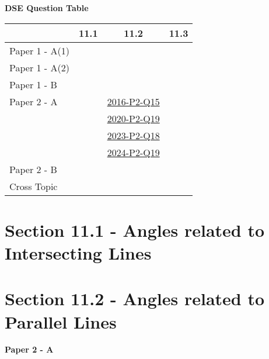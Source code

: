 \documentclass[12pt, a4paper]{article}
\begin{document}
\begin{absolutelynopagebreak}
\begin{center}
\textbf{DSE Question Table}
\end{center}
\begin{center}
\begin{tabular}{|l|c|c|c|}
\hline
        & 11.1 & 11.2 & 11.3 \\\hline
\hline
Paper 1 - A(1)&  &  &  \\
\hline
Paper 1 - A(2)&  &  &  \\
\hline
Paper 1 - B&  &  &  \\
\hline
\hline
Paper 2 - A&  & \hyperref[DSE2016-CoreP2-Q15]{2016-P2-Q15} &  \\
&  & \hyperref[DSE2020-CoreP2-Q19]{2020-P2-Q19} &  \\
&  & \hyperref[DSE2023-CoreP2-Q18]{2023-P2-Q18} &  \\
&  & \hyperref[DSE2024-CoreP2-Q19]{2024-P2-Q19} &  \\
\hline
Paper 2 - B&  &  &  \\
\hline
\hline
Cross Topic&  &  &  \\
\hline
\end{tabular}
\end{center}
\end{absolutelynopagebreak}




\section*{Section 11.1 - Angles related to Intersecting Lines}\label{section:1-11-1}





\section*{Section 11.2 - Angles related to Parallel Lines}\label{section:1-11-2}

\textbf{Paper 2 - A}
\begin{enumx}[label=\arabic*.,start=1]
\item {}\label{DSE2016-CoreP2-Q15} 
\item {}\label{DSE2020-CoreP2-Q19} 
\item {}\label{DSE2023-CoreP2-Q18} 
\item {}\label{DSE2024-CoreP2-Q19} 
\end{enumx}
\end{document}
